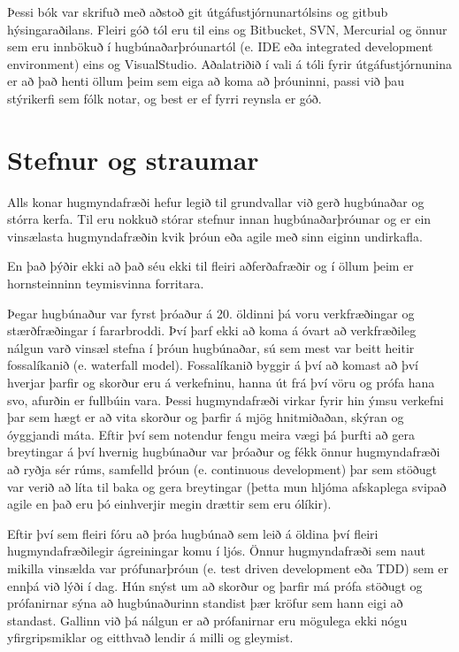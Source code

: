 Þessi bók var skrifuð með aðstoð git útgáfustjórnunartólsins og gitbub hýsingaraðilans.
Fleiri góð tól eru til eins og Bitbucket, SVN, Mercurial og önnur sem eru innbökuð í hugbúnaðarþróunartól (e. IDE eða integrated development environment) eins og VisualStudio.
Aðalatriðið í vali á tóli fyrir útgáfustjórnunina er að það henti öllum þeim sem eiga að koma að þróuninni, passi við þau stýrikerfi sem fólk notar, og best er ef fyrri reynsla er góð.

\section{Stefnur og straumar}
Alls konar hugmyndafræði hefur legið til grundvallar við gerð hugbúnaðar og stórra kerfa.
Til eru nokkuð stórar stefnur innan hugbúnaðarþróunar og er ein vinsælasta hugmyndafræðin kvik þróun eða agile með sinn eiginn undirkafla.

En það þýðir ekki að það séu ekki til fleiri aðferðafræðir og í öllum þeim er hornsteinninn teymisvinna forritara.

Þegar hugbúnaður var fyrst þróaður á 20. öldinni þá voru verkfræðingar og stærðfræðingar í fararbroddi.
Því þarf ekki að koma á óvart að verkfræðileg nálgun varð vinsæl stefna í þróun hugbúnaðar, sú sem mest var beitt heitir fossalíkanið (e. waterfall model).
Fossalíkanið byggir á því að komast að því hverjar þarfir og skorður eru á verkefninu, hanna út frá því vöru og prófa hana svo, afurðin er fullbúin vara.
Þessi hugmyndafræði virkar fyrir hin ýmsu verkefni þar sem hægt er að vita skorður og þarfir á mjög hnitmiðaðan, skýran og óyggjandi máta.
Eftir því sem notendur fengu meira vægi þá þurfti að gera breytingar á því hvernig hugbúnaður var þróaður og fékk önnur hugmyndafræði að ryðja sér rúms, samfelld þróun (e. continuous development) þar sem stöðugt var verið að líta til baka og gera breytingar (þetta mun hljóma afskaplega svipað agile en það eru þó einhverjir megin drættir sem eru ólíkir). 

Eftir því sem fleiri fóru að þróa hugbúnað sem leið á öldina því fleiri hugmyndafræðilegir ágreiningar komu í ljós.
Önnur hugmyndafræði sem naut mikilla vinsælda var prófunarþróun (e. test driven development eða TDD) sem er ennþá við lýði í dag.
Hún snýst um að skorður og þarfir má prófa stöðugt og prófanirnar sýna að hugbúnaðurinn standist þær kröfur sem hann eigi að standast.
Gallinn við þá nálgun er að prófanirnar eru mögulega ekki nógu yfirgripsmiklar og eitthvað lendir á milli og gleymist.

